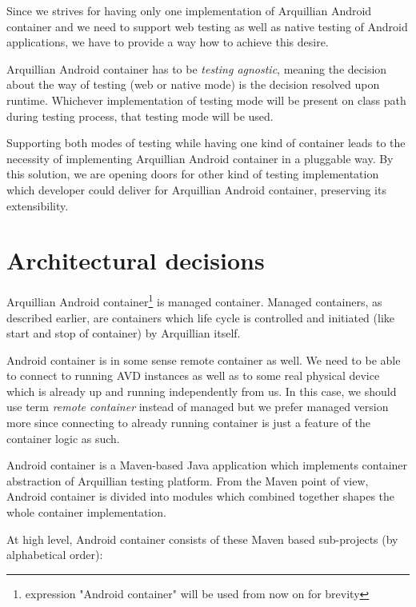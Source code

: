 \documentclass[12pt,final,oneside]{fithesis}
\begin{document}
Since we strives for having only one implementation of Arquillian Android container and we need to support web testing as well as native testing of Android applications, we have to provide a way how to achieve this desire. 

Arquillian Android container has to be \textit{testing agnostic}, meaning the decision about the way of testing (web or native mode) is the decision resolved upon runtime. Whichever implementation of testing mode will be present on class path during testing process, that testing mode will be used.

Supporting both modes of testing while having one kind of container leads to the necessity of implementing Arquillian Android container in a pluggable way. By this solution, we are opening doors for other kind of testing implementation which developer could deliver for Arquillian Android container, preserving its extensibility.

	\section{Architectural decisions}

Arquillian Android container\footnote{expression "Android container" will be used from now on for brevity} is managed container. Managed containers, as described earlier, are containers which life cycle is controlled and initiated (like start and stop of container) by Arquillian itself.

Android container is in some sense remote container as well. We need to be able to connect to running AVD instances as well as to some real physical device which is already up and running independently from us. In this case, we should use term \textit{remote container} instead of managed but we prefer managed version more since connecting to already running container is just a feature of the container logic as such.

Android container is a Maven-based Java application which implements container abstraction of Arquillian testing platform. From the Maven point of view, Android container is divided into modules which combined together shapes the whole container implementation.

At high level, Android container consists of these Maven based sub-projects (by alphabetical order):
\end{document}
